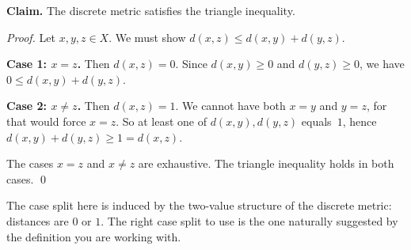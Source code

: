 \begin{example}
\textbf{Claim.} The discrete metric satisfies the triangle inequality.

\medskip
\noindent\textit{Proof.}
Let $x, y, z \in X$. We must show $d(x,z) \leq d(x,y) + d(y,z)$.

\textbf{Case 1: $x = z$.}
Then $d(x,z) = 0$. Since $d(x,y) \geq 0$ and $d(y,z) \geq 0$,
we have $0 \leq d(x,y) + d(y,z)$.

\textbf{Case 2: $x \neq z$.}
Then $d(x,z) = 1$. We cannot have both $x = y$ and $y = z$,
for that would force $x = z$. So at least one of $d(x,y), d(y,z)$
equals~$1$, hence $d(x,y) + d(y,z) \geq 1 = d(x,z)$.

The cases $x = z$ and $x \neq z$ are exhaustive. The triangle
inequality holds in both cases. \qed

\medskip
\noindent
The case split here is induced by the two-value structure of the
discrete metric: distances are $0$ or $1$. The right case split
to use is the one naturally suggested by the definition you are working with.
\end{example}
